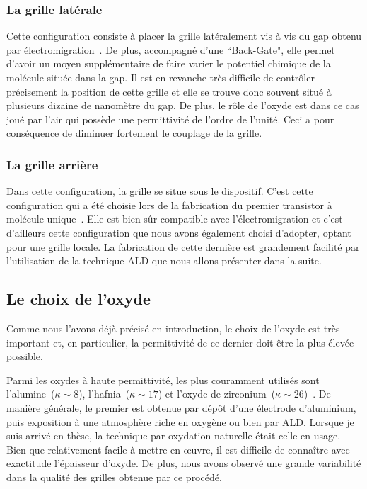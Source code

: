 \subsubsection{La grille latérale}
Cette configuration consiste à placer la grille latéralement vis à vis du gap obtenu par électromigration~\cite{Mangin2009}. De plus, accompagné d'une ``Back-Gate", elle permet d'avoir un moyen supplémentaire de faire varier le potentiel chimique de la molécule située dans la gap. Il est en revanche très difficile de contr\^oler précisement la position de cette grille et elle se trouve donc souvent situé à plusieurs dizaine de nanomètre du gap. De plus, le r\^ole de l'oxyde est dans ce cas joué par l'air qui possède une permittivité de l'ordre de l'unité. Ceci a pour conséquence de diminuer fortement le couplage de la grille.


\subsubsection{La grille arrière}
Dans cette configuration, la grille se situe sous le dispositif. C'est cette configuration qui a été choisie lors de la fabrication du premier transistor à molécule unique~\cite{Park2000}. Elle est bien s\^ur compatible avec l'électromigration et c'est d'ailleurs cette configuration que nous avons également choisi d'adopter, optant pour une grille locale. La fabrication de cette dernière est grandement facilité par l'utilisation de la technique ALD que nous allons présenter dans la suite.


\subsection{Le choix de l'oxyde}
Comme nous l'avons déjà précisé en introduction, le choix de l'oxyde est très important et, en particulier, la permittivité de ce dernier doit être la plus élevée possible.

Parmi les oxydes à haute permittivité, les plus couramment utilisés sont l'alumine~($\kappa \sim 8$), l'hafnia~($\kappa \sim 17$) et l'oxyde de zirconium~($\kappa \sim 26$)~\cite{Biercuk2003}. De manière générale, le premier est obtenue par dépôt d'une électrode d'aluminium, puis exposition à une atmosphère riche en oxygène ou bien par ALD. Lorsque je suis arrivé en thèse, la technique par oxydation naturelle était celle en usage. Bien que relativement facile à mettre en œuvre, il est difficile de connaître avec exactitude l'épaisseur d'oxyde. De plus, nous avons observé une grande variabilité dans la qualité des grilles obtenue par ce procédé.

